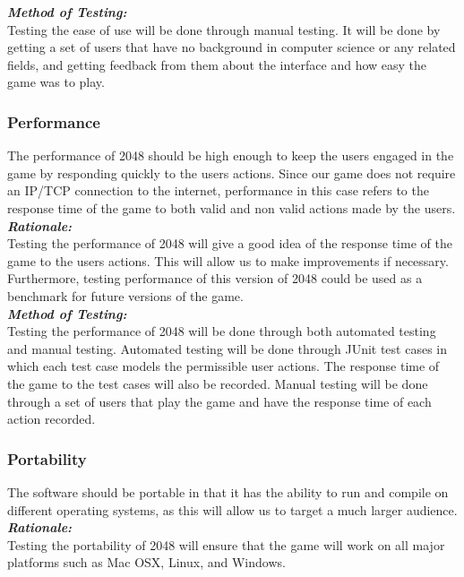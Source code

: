 \documentclass[12pt]{article}
\begin{document}
\textbf{\emph{Method of Testing:}}\\
Testing the ease of use will be done through manual testing. It will be done by 
getting a set of users that have no background in computer science or any 
related fields, and getting feedback from them about the interface and how easy 
the game was to play.  

\subsubsection{Performance}
The performance of 2048 should be high enough to keep the users engaged in the 
game by responding quickly to the users actions. Since our game does not 
require an IP/TCP connection to the internet, performance in this case refers 
to the response time of the game to both valid and non valid actions made by 
the users. \\

\textbf{\emph{Rationale:}}\\
Testing the performance of 2048 will give a good idea of the response time of 
the game to the users actions. This will allow us to make improvements if 
necessary. Furthermore, testing performance of this version of 2048 could be 
used as a benchmark for future versions of the game. \\

\textbf{\emph{Method of Testing:}}\\
Testing the performance of 2048 will be done through both automated testing and 
manual testing. Automated testing will be done through JUnit test cases in 
which each test case models the permissible user actions. The response time of 
the game to the test cases will also be recorded. Manual testing will be done 
through a set of users that play the game and have the response time of each 
action recorded. 

\subsubsection{Portability}
The software should be portable in that it has the ability to run and compile 
on different operating systems, as this will allow us to target a much larger 
audience. \\

\textbf{\emph{Rationale:}}\\
Testing the portability of 2048 will ensure that the game will work on all 
major platforms such as Mac OSX, Linux, and Windows. \\
\end{document}
